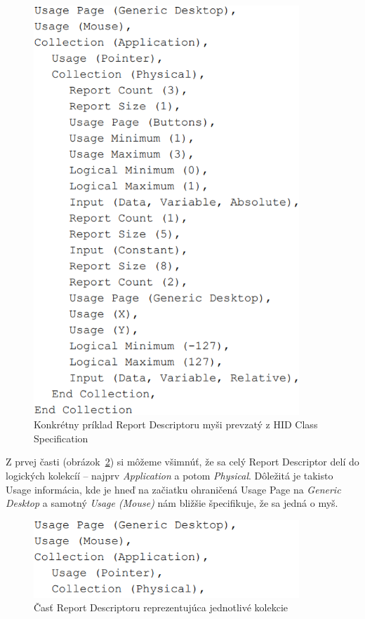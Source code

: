 \begin{figure}[!htb]
	\centering
	\includegraphics[width=10cm]{img/kap03_full_report_desc}
	\caption{Konkrétny príklad Report Descriptoru myši prevzatý z HID Class Specification~\cite{report_desc_mouse}}
	\label{obr:kap3:full_report_desc}
\end{figure}

\newpage

Z prvej časti (obrázok~\ref{obr:kap3:report_desc_collection}) si môžeme všimnúť, že sa celý Report Descriptor delí do logických kolekcíí -- najprv \textit{Application} a potom \textit{Physical}. Dôležitá je takisto Usage informácia, kde je hneď na začiatku ohraničená Usage Page na \textit{Generic Desktop} a samotný \textit{Usage (Mouse)} nám bližšie špecifikuje, že sa jedná o myš.

\begin{figure}[!htb]
	\centering
	\includegraphics[width=10cm]{img/kap03_report_desc_collection}
	\caption{Časť Report Descriptoru reprezentujúca jednotlivé kolekcie}
	\label{obr:kap3:report_desc_collection}
\end{figure}

